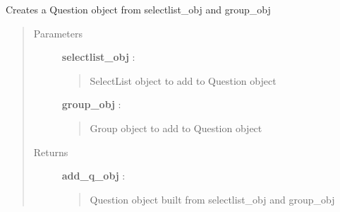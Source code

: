 \documentclass[letterpaper,10pt,english]{sphinxmanual}
\begin{document}
\begin{fulllineitems}
\label{pytan.utils:pytan.utils.build_manual_q}
Creates a Question object from selectlist\_obj and group\_obj
\begin{quote}\begin{description}
\item[{Parameters}] \leavevmode
\textbf{selectlist\_obj} : {\hyperref[taniumpy.object_types:taniumpy.object_types.select_list.SelectList]{}}
\begin{quote}

SelectList object to add to Question object
\end{quote}

\textbf{group\_obj} : {\hyperref[taniumpy.object_types:taniumpy.object_types.group.Group]{}}
\begin{quote}

Group object to add to Question object
\end{quote}

\item[{Returns}] \leavevmode
\textbf{add\_q\_obj} : {\hyperref[taniumpy.object_types:taniumpy.object_types.question.Question]{}}
\begin{quote}

Question object built from selectlist\_obj and group\_obj
\end{quote}

\end{description}\end{quote}

\end{fulllineitems}

\end{document}
